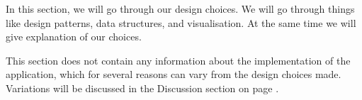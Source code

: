 In this section, we will go through our design choices. We will go through things like design patterns, data structures, and visualisation. At the same time we will give explanation of our choices.

This section does not contain any information about the implementation of the application, which for several reasons can vary from the design choices made. Variations will be discussed in the Discussion section on page \pageref{sec:Discussion}.